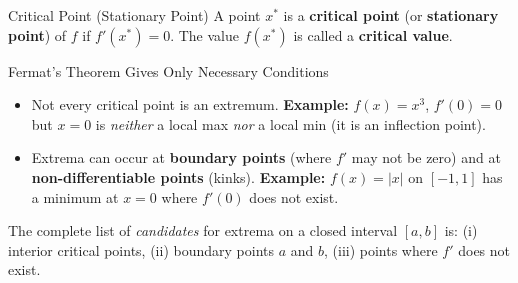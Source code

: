 \documentclass[12pt, a4paper]{article}
\theoremstyle{definition}
\begin{document}
\begin{defbox}{Critical Point (Stationary Point)}
A point $x^*$ is a \textbf{critical point} (or \textbf{stationary point})
of $f$ if $f'(x^*) = 0$.  The value $f(x^*)$ is called a
\textbf{critical value}.
\end{defbox}

\begin{warnbox}{Fermat's Theorem Gives Only Necessary Conditions}
\begin{itemize}
  \item Not every critical point is an extremum.
        \textbf{Example:} $f(x)=x^3$, $f'(0)=0$ but $x=0$ is
        \emph{neither} a local max \emph{nor} a local min (it is an
        inflection point).
  \item Extrema can occur at \textbf{boundary points} (where $f'$ may
        not be zero) and at \textbf{non-differentiable points} (kinks).
        \textbf{Example:} $f(x)=|x|$ on $[-1,1]$ has a minimum at $x=0$
        where $f'(0)$ does not exist.
\end{itemize}
The complete list of \emph{candidates} for extrema on a closed interval
$[a,b]$ is: (i) interior critical points, (ii) boundary points $a$ and $b$,
(iii) points where $f'$ does not exist.
\end{warnbox}
\end{document}

